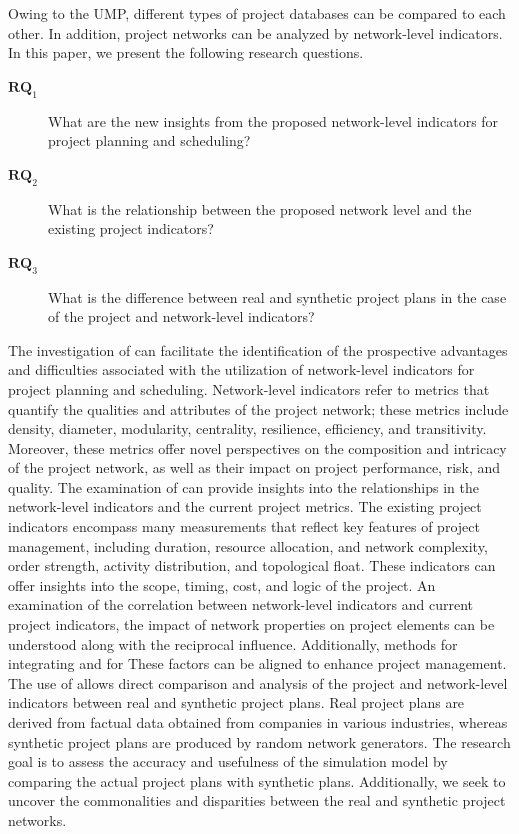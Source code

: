 \documentclass[preprint,
3p]{elsarticle} %
\begin{document}
Owing to the UMP, different types of project databases can be compared
to each other. In addition, project networks can be analyzed by
network-level indicators. In this paper, we present the following
research questions.

\begin{description}
\item[$\mathbf{RQ}_1$\label{RQ1}] What are the new insights from the proposed network-level indicators for project planning and scheduling?
\item[$\mathbf{RQ}_2$\label{RQ2}] What is the relationship between the proposed network level and the existing project indicators?
\item[$\mathbf{RQ}_3$\label{RQ3}] What is the difference between real and synthetic project plans in the case of the project and network-level indicators?
\end{description}

The investigation of  can facilitate the identification of
the prospective advantages and difficulties associated with the
utilization of network-level indicators for project planning and
scheduling. Network-level indicators refer to metrics that quantify the
qualities and attributes of the project network; these metrics include
density, diameter, modularity, centrality, resilience, efficiency, and
transitivity. Moreover, these metrics offer novel perspectives on the
composition and intricacy of the project network, as well as their
impact on project performance, risk, and quality. The examination of
 can provide insights into the relationships in the
network-level indicators and the current project metrics. The existing
project indicators encompass many measurements that reflect key features
of project management, including duration, resource allocation, and
network complexity, order strength, activity distribution, and
topological float. These indicators can offer insights into the scope,
timing, cost, and logic of the project. An examination of the
correlation between network-level indicators and current project
indicators, the impact of network properties on project elements can be
understood along with the reciprocal influence. Additionally, methods
for integrating and for These factors can be aligned to enhance project
management. The use of  allows direct comparison and
analysis of the project and network-level indicators between real and
synthetic project plans. Real project plans are derived from factual
data obtained from companies in various industries, whereas synthetic
project plans are produced by random network generators. The research
goal is to assess the accuracy and usefulness of the simulation model by
comparing the actual project plans with synthetic plans. Additionally,
we seek to uncover the commonalities and disparities between the real
and synthetic project networks.
\end{document}
